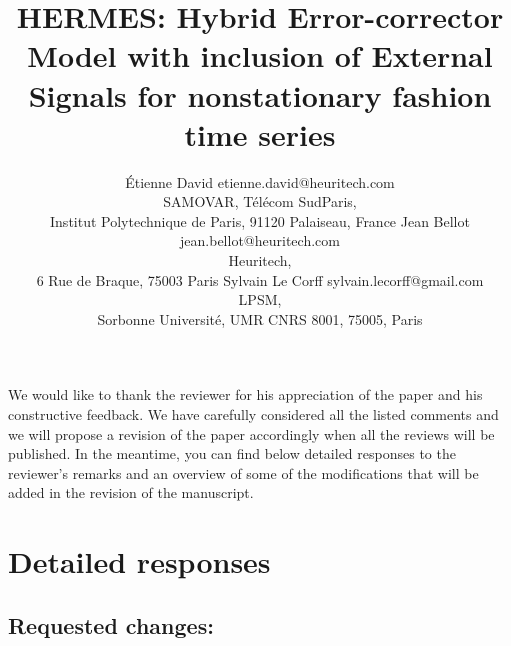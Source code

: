 \documentclass[10pt]{article} %
\title{HERMES: Hybrid Error-corrector Model with inclusion of External Signals for nonstationary fashion time series}
\author{\name \'Etienne David \email etienne.david@heuritech.com \\
      \addr SAMOVAR, Télécom SudParis,\\
      Institut Polytechnique de Paris, 91120 Palaiseau, France
      \AND
      \name Jean Bellot \email jean.bellot@heuritech.com \\
      \addr Heuritech, \\
      6 Rue de Braque, 75003 Paris
      \AND
      \name Sylvain Le Corff \email sylvain.lecorff@gmail.com\\
      \addr LPSM, \\
      Sorbonne Université, UMR CNRS 8001, 75005, Paris
      }
\begin{document}
\maketitle

We would like to thank the reviewer for his appreciation of the paper and his constructive feedback. We have carefully considered all the listed comments and we will propose a revision of the paper accordingly when all the reviews will be published. In the meantime, you can find below detailed responses to the reviewer's remarks and an overview of some of the  modifications that will be added in the revision of the manuscript.

\section*{Detailed responses}

\subsection*{Requested changes:}
\end{document}
